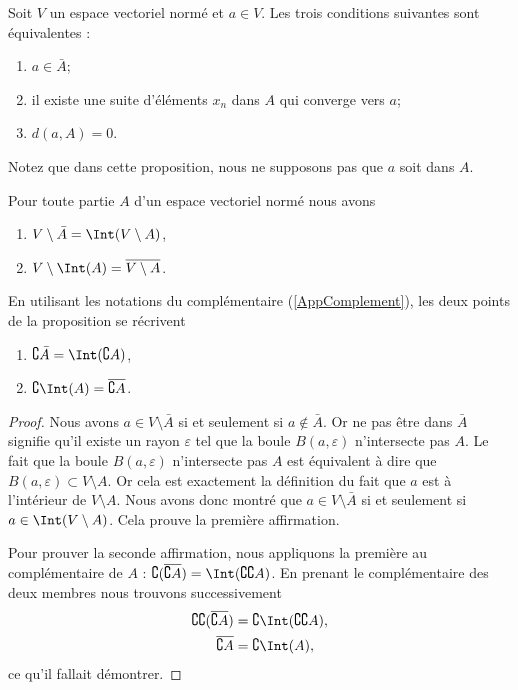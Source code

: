 \begin{proposition}     \label{PROPooEURXooHHpkhd}
	Soit \( V\) un espace vectoriel normé et \( a\in V\). Les trois conditions suivantes sont équivalentes :
	\begin{enumerate}
		\item
		      \( a\in\bar A\);
		\item
		      il existe une suite d'éléments \( x_n\) dans \( A\) qui converge vers \( a\);
		\item
		      \( d(a,A)=0\).
	\end{enumerate}
\end{proposition}
Notez que dans cette proposition, nous ne supposons pas que \( a\) soit dans \( A\).

\begin{proposition}		\label{PropComleIntBar}
	Pour toute partie \( A\) d'un espace vectoriel normé nous avons
	\begin{enumerate}
		\item
		      \( V\setminus\bar A=\Int(V\setminus A)\),
		\item
		      \( V\setminus\Int(A)=\overline{ V\setminus A }\).
	\end{enumerate}
\end{proposition}

En utilisant les notations du complémentaire (\ref{AppComplement}), les deux points de la proposition se récrivent
\begin{enumerate}
	\item
	      \( \complement \bar A=\Int(\complement A)\),
	      \item\label{ItemLemPropComplementiv}
	      \( \complement\Int(A)=\overline{ \complement A }\).
\end{enumerate}

\begin{proof}
	Nous avons \( a\in V\setminus\bar A\) si et seulement si \( a\notin\bar A\). Or ne pas être dans \( \bar A\) signifie qu'il existe un rayon \( \varepsilon\) tel que la boule \( B(a,\varepsilon)\) n'intersecte pas \( A\). Le fait que la boule \( B(a,\varepsilon)\) n'intersecte pas \( A\) est équivalent à dire que \( B(a,\varepsilon)\subset V\setminus A\). Or cela est exactement la définition du fait que \( a\) est à l'intérieur de \( V\setminus A\). Nous avons donc montré que \( a\in V\setminus \bar A\) si et seulement si \( a\in\Int(V\setminus A)\). Cela prouve la première affirmation.

	Pour prouver la seconde affirmation, nous appliquons la première au complémentaire de \( A\) : \( \complement(\overline{ \complement A })=\Int(\complement\complement A)\). En prenant le complémentaire des deux membres nous trouvons successivement
	\begin{equation}
		\begin{aligned}[]
			\complement\complement(\overline{ \complement A }) & =\complement\Int(\complement\complement A), \\
			\overline{ \complement A }                         & =\complement\Int(A),
		\end{aligned}
	\end{equation}
	ce qu'il fallait démontrer.
\end{proof}

